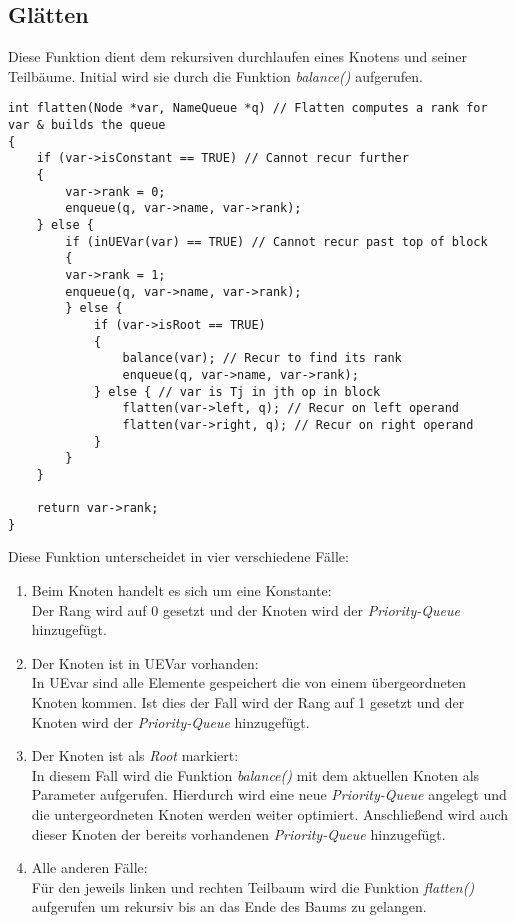 \subsection{Glätten}
Diese Funktion dient dem rekursiven durchlaufen eines Knotens und seiner Teilbäume. Initial wird sie durch die Funktion \textit{balance()} aufgerufen.\\

\begin{lstlisting}[caption=Funktion flatten(), label=list:Funktion flatten()]
int flatten(Node *var, NameQueue *q) // Flatten computes a rank for var & builds the queue
{
	if (var->isConstant == TRUE) // Cannot recur further
	{
		var->rank = 0;
		enqueue(q, var->name, var->rank);
	} else {
		if (inUEVar(var) == TRUE) // Cannot recur past top of block
		{
		var->rank = 1;
		enqueue(q, var->name, var->rank);
		} else {
			if (var->isRoot == TRUE)
			{
				balance(var); // Recur to find its rank
				enqueue(q, var->name, var->rank);
			} else { // var is Tj in jth op in block
				flatten(var->left, q); // Recur on left operand
				flatten(var->right, q); // Recur on right operand
			}
		}
	}

	return var->rank;
}
\end{lstlisting}

Diese Funktion unterscheidet in vier verschiedene Fälle:
\begin{enumerate}
	\item Beim Knoten handelt es sich um eine Konstante:\\
	Der Rang wird auf 0 gesetzt und der Knoten wird der \textit{Priority-Queue} hinzugefügt.
	\item Der Knoten ist in UEVar vorhanden:\\
	In UEvar sind alle Elemente gespeichert die von einem übergeordneten Knoten kommen. Ist dies der Fall wird der Rang auf 1 gesetzt und der Knoten wird der \textit{Priority-Queue} hinzugefügt.
	\item Der Knoten ist als \textit{Root} markiert:\\
	In diesem Fall wird die Funktion \textit{balance()} mit dem aktuellen Knoten als Parameter aufgerufen. Hierdurch wird eine neue \textit{Priority-Queue} angelegt und die untergeordneten Knoten werden weiter optimiert. Anschließend wird auch dieser Knoten der bereits vorhandenen \textit{Priority-Queue} hinzugefügt.
	\item Alle anderen Fälle:\\
	Für den jeweils linken und rechten Teilbaum wird die Funktion \textit{flatten()} aufgerufen um rekursiv bis an das Ende des Baums zu gelangen.
\end{enumerate}

